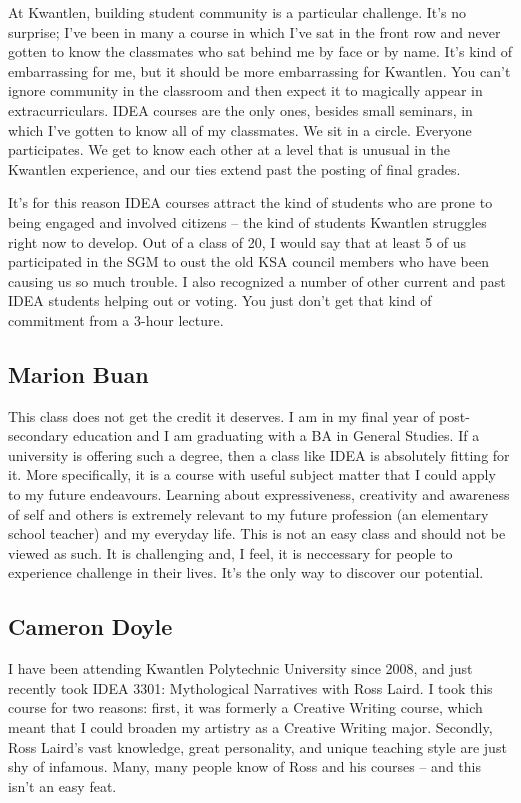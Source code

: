 \documentclass[letterpaper,10pt,headsepline]{scrreprt}
\begin{document}
At Kwantlen, building student community is a particular challenge. It's no surprise; I've been in many a course in which I've sat in the front row and never gotten to know the classmates who sat behind me by face or by name. It's kind of embarrassing for me, but it should be more embarrassing for Kwantlen. You can't ignore community in the classroom and then expect it to magically appear in extracurriculars. IDEA courses are the only ones, besides small seminars, in which I've gotten to know all of my classmates. We sit in a circle. Everyone participates. We get to know each other at a level that is unusual in the Kwantlen experience, and our ties extend past the posting of final grades.

It's for this reason IDEA courses attract the kind of students who are prone to being engaged and involved citizens -- the kind of students Kwantlen struggles right now to develop. Out of a class of 20, I would say that at least 5 of us participated in the SGM to oust the old KSA council members who have been causing us so much trouble. I also recognized a number of other current and past IDEA students helping out or voting. You just don't get that kind of commitment from a 3-hour lecture.

\subsection{Marion Buan}

This class does not get the credit it deserves. I am in my final year of post-secondary education and I am graduating with a BA in General Studies. If a university is offering such a degree, then a class like IDEA is absolutely fitting for it. More specifically, it is a course with useful subject matter that I could apply to my future endeavours. Learning about expressiveness, creativity and awareness of self and others is extremely relevant to my future profession (an elementary school teacher) and my everyday life. This is not an easy class and should not be viewed as such. It is challenging and, I feel, it is neccessary for people to experience challenge in their lives. It's the only way to discover our potential.

\subsection{Cameron Doyle}

I have been attending Kwantlen Polytechnic University since 2008, and just
recently took IDEA 3301: Mythological Narratives with Ross Laird. I took
this course for two reasons: first, it was formerly a Creative Writing
course, which meant that I could broaden my artistry as a Creative Writing
major. Secondly, Ross Laird's vast knowledge, great personality, and unique
teaching style are just shy of infamous. Many, many people know of Ross and
his courses -- and this isn't an easy feat.
\end{document}
